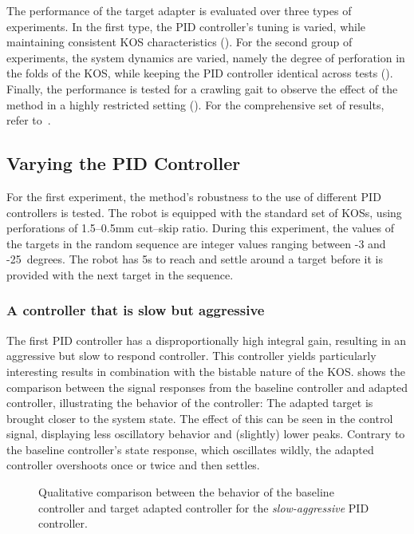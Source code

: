 The performance of the target adapter is evaluated over three types of experiments.
In the first type, the PID controller's tuning is varied, while maintaining consistent KOS characteristics ().
For the second group of experiments, the system dynamics are varied, namely the degree of perforation in the folds of the KOS, while keeping the PID controller identical across tests ().
Finally, the performance is tested for a crawling gait to observe the effect of the method in a highly restricted setting ().
For the comprehensive set of results, refer to~.

\subsection{Varying the PID Controller}\label{subsec:varying-pid}
For the first experiment, the method's robustness to the use of different PID controllers is tested.
The robot is equipped with the standard set of KOSs, using perforations of 1.5--0.5\si{mm} cut--skip ratio.
During this experiment, the values of the targets in the random sequence are integer values ranging between -3 and -25~degrees.
The robot has 5\si{\second} to reach and settle around a target before it is provided with the next target in the sequence.

\subsubsection{A controller that is slow but aggressive}
The first PID controller has a disproportionally high integral gain, resulting in an aggressive but slow to respond controller.
This controller yields particularly interesting results in combination with the bistable nature of the KOS.
 shows the comparison between the signal responses from the baseline controller and adapted controller, illustrating the behavior of the controller: The adapted target is brought closer to the system state.
The effect of this can be seen in the control signal, displaying less oscillatory behavior and (slightly) lower peaks.
Contrary to the baseline controller's state response, which oscillates wildly, the adapted controller overshoots once or twice and then settles.

\begin{figure}
    \centering
    
    \vspace*{-2em}
    \caption{Qualitative comparison between the behavior of the baseline controller and target adapted controller for the \emph{slow-aggressive} PID controller.}
    \label{fig:slow-overshoot-overlay}
\end{figure}

